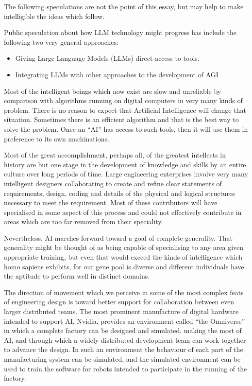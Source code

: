 \documentclass[10pt,titlepage]{book}
\begin{document}
The following speculations are not the point of this essay, but may help to make intelligible the ideas which follow.

Public speculation about how LLM technology might progress has include the following two very general approaches:

\begin{itemize}
\item Giving Large Language Models (LLMs) direct access to tools.
\item Integrating LLMs with other approaches to the development of AGI
\end{itemize}

Most of the intelligent beings which now exist are slow and unreliable by comparison with algorithms running on digital computers in very many kinds of problem.
There is no reason to expect that Artificial Intelligence will change that situation.
Sometimes there is an efficient algorithm and that is the best way to solve the problem.
Once an ``AI'' has access to such tools, then it will use them in preference to its own machinations.

Most of the great accomplishment, perhaps all, of the greatest intellects in history are but one stage in the development of knowledge and skills by an entire culture over long periods of time.
Large engineering enterprises involve very many intelligent designers collaborating to create and refine clear statements of requirements, design, coding and details of the physical and logical structures necessary to meet the requirement.
Most of these contributors will have specialised in some aspect of this process and could not effectively contribute in areas which are too far removed from their speciality.

Nevertheless, AI marches forward toward a goal of complete generality.
That generality might be thought of as being capable of specialising to any area given appropriate training, but even that would exceed the kinds of intelligence which homo sapiens exhibits, for our gene pool is diverse and different individuals have the aptitude to perform well in distinct domains.

The direction of movement which we perceive in some of the most complex feats of engineering design is toward better support for collaboration between even larger distributed teams.
The most prominent manufacture of digital hardware intended to support AI, Nvidia, provides an environment called ``the Omniverse'' in which a complete factory can be designed and simulated, making the most of AI, and through which a widely distributed development team can work together to advance the design.
In such an environment the behaviour of each part of the manufacturing system can be simulated, and the simulated environment can be used to train the software for robots intended to participate in the running of the factory.
\end{document}
